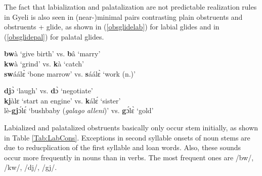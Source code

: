 The fact that labialization and palatalization are not predictable realization rules in Gyeli is also seen in (near-)minimal pairs contrasting plain obstruents and obstruents + glide, as shown in (\ref{obsglidelab}) for labial glides and in (\ref{obsglidepal}) for palatal glides.

\begin{exe} \ex \label{obsglidelab}
{\bfseries bw}à `give birth' vs. {\bfseries b}â `marry' \\
{\bfseries kw}à `grind' vs. {\bfseries k}à `catch' \\
{\bfseries sw}áálɛ̀ `bone marrow' vs. {\bfseries s}áálɛ̀ `work (n.)'
\end{exe}

\begin{exe} \ex \label{obsglidepal}
{\bfseries dj}ɔ̀ `laugh' vs. {\bfseries d}ɔ̀ `negotiate' \\
{\bfseries kj}àlɛ `start an engine' vs. {\bfseries k}álɛ́ `sister' \\
lè-{\bfseries gj}ɔ́lɛ́ `bushbaby ({\itshape galago alleni})' vs. {\bfseries g}ɔ́lɛ̀ `gold'
\end{exe}



Labialized and palatalized obstruents basically only occur stem initially, as shown in Table \ref{Tab:LabCons}. Exceptions in second syllable onsets of noun stems are due to reducplication of the first syllable and loan words. Also, these sounds occur more frequently in nouns than in verbs. The most frequent ones are /bw/, /kw/, /dj/, /gj/.

